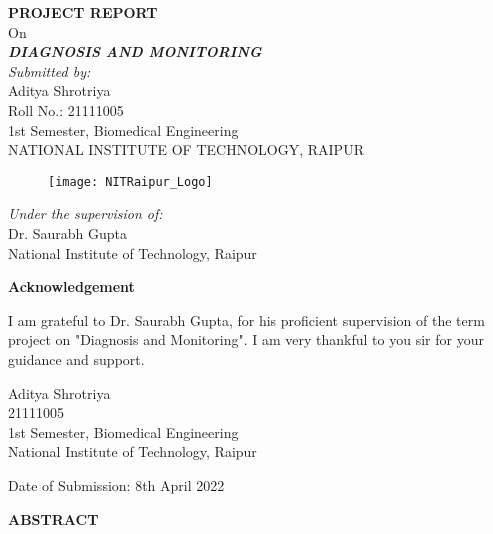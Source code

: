 \documentclass[12pt]{article}
\begin{document}
\begin{titlepage}
\begin{center}

\large{\bfseries PROJECT REPORT}\\
[1mm]
\large{On}\\
[1cm]
\Large{\textit{\bfseries DIAGNOSIS AND MONITORING}}\\
[0.65cm]
\large{\textit{Submitted by:}}\\
{Aditya Shrotriya}\\
{Roll No.: 21111005}\\
{1st Semester, Biomedical Engineering}\\
[0.5cm]
\large{NATIONAL INSTITUTE OF TECHNOLOGY, RAIPUR}\\
[0.2cm]

\begin{figure}[h]
\centering
\texttt{[image: NITRaipur\_Logo]}\\
[0.5cm]
\end{figure}

\large{\textit{Under the supervision of:}}\\
[0.25cm]
\large{Dr. Saurabh Gupta}\\
[2.5mm]
\large{National Institute of Technology, Raipur}

\end{center}
\end{titlepage}
\clearpage
\begin{center}
\Large{\bfseries Acknowledgement}\\
[1cm]
\end{center}
\large{I am grateful to Dr. Saurabh Gupta, for his proficient supervision of the term project on "Diagnosis and Monitoring". I am very thankful to you sir for your guidance and support.}\\
[1.5cm]

\begin{flushright}
\large{Aditya Shrotriya}\\
[0.5cm]
\large{21111005}\\
[0.5cm]
\large{1st Semester, Biomedical Engineering}\\
[0.5cm]
\large{National Institute of Technology, Raipur}\\
[1.5cm]
\end{flushright}
\large{Date of Submission: 8th April 2022}
\clearpage

\begin{center}
\Large{\bfseries ABSTRACT}\\
[.5cm]
\end{center}
\end{document}
